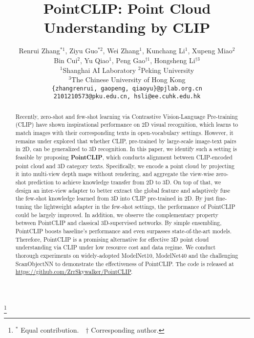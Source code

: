 \documentclass[10pt,twocolumn,letterpaper]{article}
\newcommand\blfootnote[1]{\begingroup
  \renewcommand\thefootnote{}\footnote{#1}\addtocounter{footnote}{-1}\endgroup
}
\begin{document}
\title{PointCLIP: Point Cloud Understanding by CLIP}



\author{Renrui Zhang$^{*1}$, Ziyu Guo$^{*2}$, Wei Zhang$^{1}$, Kunchang Li$^{1}$, Xupeng Miao$^{2}$ \\ Bin Cui$^{2}$,  Yu Qiao$^1$, Peng Gao$^{ \dagger 1}$, Hongsheng Li$^{ \dagger 3}$\\ 
  $^1$Shanghai AI Laboratory \quad 
  $^2$Peking University\\
  $^3$The Chinese University of Hong Kong\\
\texttt{\{zhangrenrui, gaopeng, qiaoyu\}@pjlab.org.cn} \\
\texttt{2101210573@pku.edu.cn, hsli@ee.cuhk.edu.hk}
}



\maketitle
\blfootnote{$^*$ Equal contribution.\ \  $\dagger$ Corresponding author.}
\begin{abstract}

    Recently, zero-shot and few-shot learning via Contrastive Vision-Language Pre-training (CLIP) have shown inspirational performance on 2D visual recognition, which learns to match images with their corresponding texts in open-vocabulary settings. 
However, it remains under explored that whether CLIP, pre-trained by large-scale image-text pairs in 2D, can be generalized to 3D recognition. In this paper, we identify such a setting is feasible by proposing \textbf{PointCLIP}, which conducts alignment between CLIP-encoded point cloud and 3D category texts. Specifically, we encode a point cloud by projecting it into multi-view depth maps without rendering, and aggregate the view-wise zero-shot prediction to achieve knowledge transfer from 2D to 3D. 
    On top of that, we design an inter-view adapter to better extract the global feature and adaptively fuse the few-shot knowledge learned from 3D into CLIP pre-trained in 2D. By just fine-tuning the lightweight adapter in the few-shot settings, the performance of PointCLIP could be largely improved. 
    In addition, we observe the complementary property between PointCLIP and classical 3D-supervised networks. By simple ensembling, PointCLIP boosts baseline's performance and even surpasses state-of-the-art models.
    Therefore, PointCLIP is a promising alternative for effective 3D point cloud understanding via CLIP under low resource cost and data regime. We conduct thorough experiments on widely-adopted ModelNet10, ModelNet40 and the challenging ScanObjectNN to demonstrate the effectiveness of PointCLIP. The code is released at \url{https://github.com/ZrrSkywalker/PointCLIP}.
   
\end{abstract}
\end{document}
